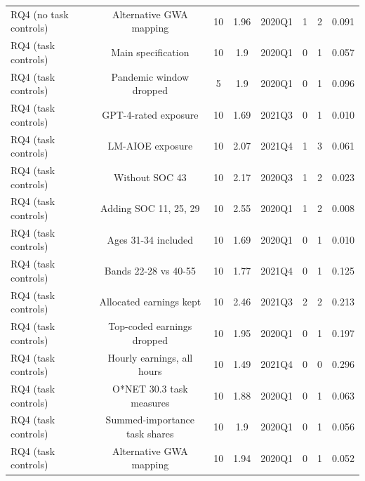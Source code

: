 \begin{table}[htbp]
\begin{tabular}{lccccccc}
RQ4 (no task controls) & Alternative GWA mapping & 10 & 1.96 & 2020Q1 & 1 & 2 & 0.091 \\
RQ4 (task controls) & Main specification & 10 & 1.9 & 2020Q1 & 0 & 1 & 0.057 \\
RQ4 (task controls) & Pandemic window dropped & 5 & 1.9 & 2020Q1 & 0 & 1 & 0.096 \\
RQ4 (task controls) & GPT-4-rated exposure & 10 & 1.69 & 2021Q3 & 0 & 1 & 0.010 \\
RQ4 (task controls) & LM-AIOE exposure & 10 & 2.07 & 2021Q4 & 1 & 3 & 0.061 \\
RQ4 (task controls) & Without SOC 43 & 10 & 2.17 & 2020Q3 & 1 & 2 & 0.023 \\
RQ4 (task controls) & Adding SOC 11, 25, 29 & 10 & 2.55 & 2020Q1 & 1 & 2 & 0.008 \\
RQ4 (task controls) & Ages 31-34 included & 10 & 1.69 & 2020Q1 & 0 & 1 & 0.010 \\
RQ4 (task controls) & Bands 22-28 vs 40-55 & 10 & 1.77 & 2021Q4 & 0 & 1 & 0.125 \\
RQ4 (task controls) & Allocated earnings kept & 10 & 2.46 & 2021Q3 & 2 & 2 & 0.213 \\
RQ4 (task controls) & Top-coded earnings dropped & 10 & 1.95 & 2020Q1 & 0 & 1 & 0.197 \\
RQ4 (task controls) & Hourly earnings, all hours & 10 & 1.49 & 2021Q4 & 0 & 0 & 0.296 \\
RQ4 (task controls) & O*NET 30.3 task measures & 10 & 1.88 & 2020Q1 & 0 & 1 & 0.063 \\
RQ4 (task controls) & Summed-importance task shares & 10 & 1.9 & 2020Q1 & 0 & 1 & 0.056 \\
RQ4 (task controls) & Alternative GWA mapping & 10 & 1.94 & 2020Q1 & 0 & 1 & 0.052 \\
\bottomrule
\end{tabular}
\par\vspace{2pt}{\footnotesize Counts of individually significant pre-period coefficients, the largest $|$estimate/SE$|$, and the p-value of the joint Wald test that all pre-period coefficients are zero (clustered covariance; blank for runs made before step 07 saved it).}
\end{table}
